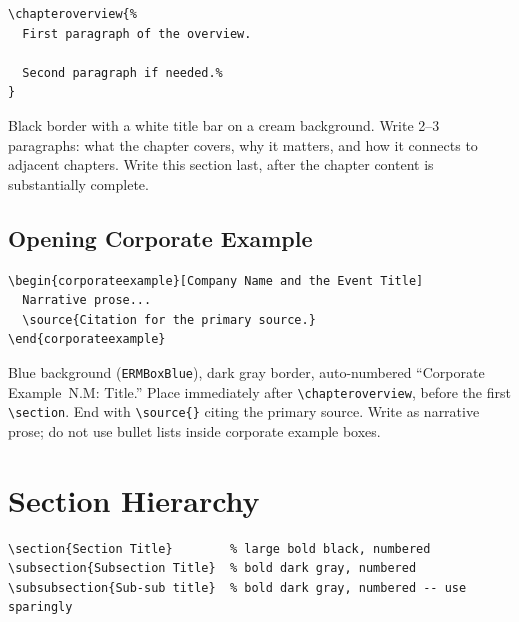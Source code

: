 \documentclass[11pt,openany]{book}
\newcommand{\code}[1]{\texttt{\small #1}}
\begin{document}
\begin{lstlisting}
\chapteroverview{%
  First paragraph of the overview.

  Second paragraph if needed.%
}
\end{lstlisting}

Black border with a white title bar on a cream background. Write 2--3 paragraphs: what the chapter covers, why it matters, and how it connects to adjacent chapters. Write this section last, after the chapter content is substantially complete.

\subsection{Opening Corporate Example}

\begin{lstlisting}
\begin{corporateexample}[Company Name and the Event Title]
  Narrative prose...
  \source{Citation for the primary source.}
\end{corporateexample}
\end{lstlisting}

Blue background (\code{ERMBoxBlue}), dark gray border, auto-numbered ``Corporate Example~N.M: Title.'' Place immediately after \code{\textbackslash chapteroverview}, before the first \code{\textbackslash section}. End with \code{\textbackslash source\{\}} citing the primary source. Write as narrative prose; do not use bullet lists inside corporate example boxes.


\section{Section Hierarchy}
\label{sec:sections}

\begin{lstlisting}
\section{Section Title}        % large bold black, numbered
\subsection{Subsection Title}  % bold dark gray, numbered
\subsubsection{Sub-sub title}  % bold dark gray, numbered -- use sparingly
\end{lstlisting}
\end{document}
